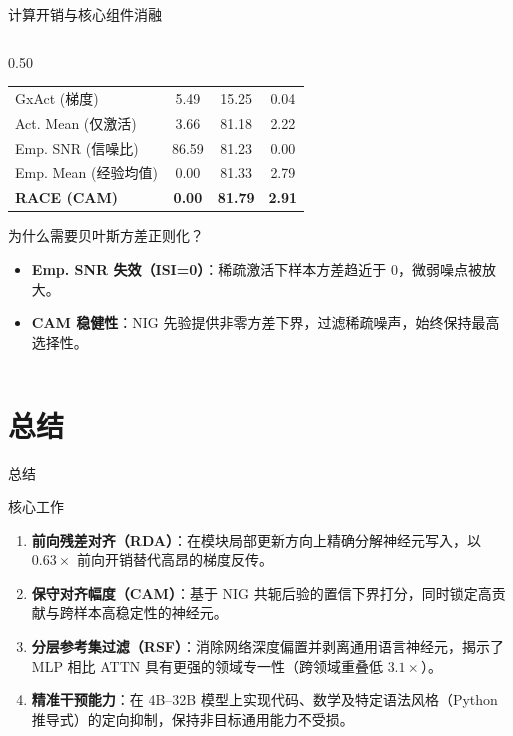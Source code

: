\documentclass{beamer}
\begin{document}
\begin{frame}{计算开销与核心组件消融}
\begin{columns}[T]
\begin{column}{0.50\textwidth}
\begin{center}
\begin{tabular}{l|cc|c}
                \midrule
                GxAct (梯度) & 5.49 & 15.25 & 0.04 \\
                Act. Mean (仅激活) & 3.66 & 81.18 & 2.22 \\
                Emp. SNR (信噪比) & 86.59 & 81.23 & 0.00 \\
                Emp. Mean (经验均值) & 0.00 & 81.33 & 2.79 \\
                \textbf{RACE (CAM)} & \alert{\textbf{0.00}} & \textbf{81.79} & \alert{\textbf{2.91}} \\
                \bottomrule
            \end{tabular}
            \end{center}
            \vspace{-0.5em}
            \begin{alertblock}{为什么需要贝叶斯方差正则化？}\scriptsize
                \begin{itemize}
                    \item \textbf{Emp. SNR 失效（ISI=0）}：稀疏激活下样本方差趋近于 0，微弱噪点被放大。
                    \item \textbf{CAM 稳健性}：NIG 先验提供非零方差下界，过滤稀疏噪声，始终保持最高选择性。
                \end{itemize}
            \end{alertblock}
        \end{column}
    \end{columns}
\end{frame}

\section{总结}

\begin{frame}{总结}
    \begin{block}{核心工作}
        \begin{enumerate}\setlength{\itemsep}{0.4em}
            \item \textbf{前向残差对齐（RDA）}：在模块局部更新方向上精确分解神经元写入，以 $0.63\times$ 前向开销替代高昂的梯度反传。
            \item \textbf{保守对齐幅度（CAM）}：基于 NIG 共轭后验的置信下界打分，同时锁定高贡献与跨样本高稳定性的神经元。
            \item \textbf{分层参考集过滤（RSF）}：消除网络深度偏置并剥离通用语言神经元，揭示了 MLP 相比 ATTN 具有更强的领域专一性（跨领域重叠低 $3.1\times$）。
            \item \textbf{精准干预能力}：在 4B--32B 模型上实现代码、数学及特定语法风格（Python 推导式）的定向抑制，保持非目标通用能力不受损。
        \end{enumerate}
    \end{block}
    \vfill
    \centering\small{}
\end{frame}

\QApage
\end{document}
